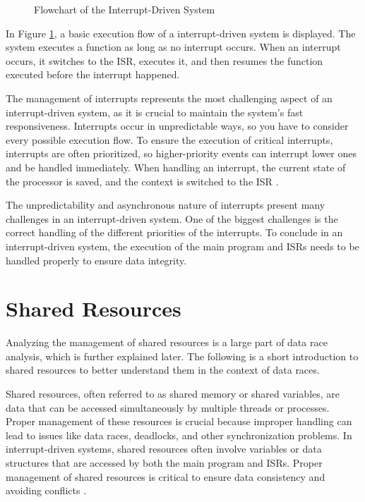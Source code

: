 \documentclass[
fancyheadings, %
%
%
]{stsreprt}
\begin{document}
{\begin{figure}[H]
			\caption{Flowchart of the Interrupt-Driven System}
			\label{fig:ids}
		\end{figure}
		
		In Figure \ref{fig:ids}, a basic execution flow of a interrupt-driven system is displayed. The system executes a function as long as no interrupt occurs. When an interrupt occurs, it switches to the \ac{ISR}, executes it, and then resumes the function executed before the interrupt happened.
		
		The management of interrupts represents the most challenging aspect of an interrupt-driven system, as it is crucial to maintain the system's fast responsiveness. Interrupts occur in unpredictable ways, so you have to consider every possible execution flow. To ensure the execution of critical interrupts, interrupts are often prioritized, so higher-priority events can interrupt lower ones and be handled immediately. When handling an interrupt, the current state of the processor is saved, and the context is switched to the \ac{ISR} \cite{wang2020}.
		
		The unpredictability and asynchronous nature of interrupts present many challenges in an interrupt-driven system. One of the biggest challenges is the correct handling of the different priorities of the interrupts.\cite{wang2020}
		To conclude in an interrupt-driven system, the execution of the main program and \acp{ISR} needs to be handled properly to ensure data integrity. 
		
		\section{Shared Resources}
		Analyzing the management of shared resources is a large part of data race analysis, which is further explained later. The following is a short introduction to shared resources to better understand them in the context of data races.
		
		Shared resources, often referred to as shared memory or shared variables, are data that can be accessed simultaneously by multiple threads or processes. Proper management of these resources is crucial because improper handling can lead to issues like data races, deadlocks, and other synchronization problems. In interrupt-driven systems, shared resources often involve variables or data structures that are accessed by both the main program and \acp{ISR}. Proper management of shared resources is critical to ensure data consistency and avoiding conflicts \cite{herlihy2008}.
		
}
\end{document}
